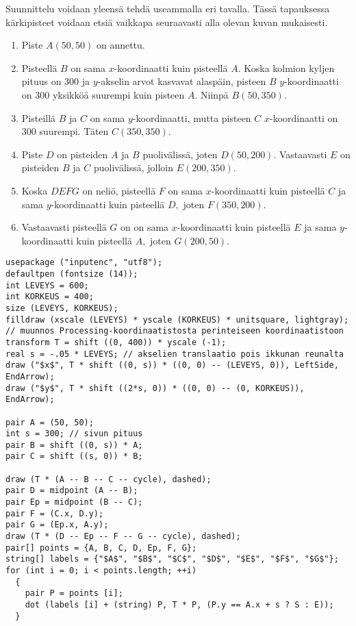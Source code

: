 \documentclass[11pt]{article}
\begin{document}
Suunnittelu voidaan yleensä tehdä useammalla eri tavalla. Tässä
tapauksessa kärkipisteet voidaan etsiä vaikkapa seuraavasti alla
olevan kuvan mukaisesti.
\begin{enumerate}
\item Piste \(A (50, 50)\) on annettu.
\item Pisteellä \(B\) on sama \(x\)-koordinaatti kuin pisteellä \(A.\)
Koska kolmion kyljen pituus on 300 ja \(y\)-akselin arvot
kasvavat alaspäin, pisteen \(B\) \(y\)-koordinaatti on 300
yksikköä suurempi kuin pisteen \(A\). Niinpä \(B(50, 350).\)
\item Pisteillä \(B\) ja \(C\) on sama \(y\)-koordinaatti, mutta pisteen
\(C\) \(x\)-koordinaatti on 300 suurempi. Täten \(C(350, 350).\)
\item Piste \(D\) on pisteiden \(A\) ja \(B\) puolivälissä, joten \(D(50,
      200).\) Vastaavasti \(E\) on pisteiden \(B\) ja \(C\) puolivälissä,
jolloin \(E(200, 350).\)
\item Koska \(DEFG\) on neliö, pisteellä \(F\) on sama \(x\)-koordinaatti
kuin pisteellä \(C\) ja sama \(y\)-koordinaatti kuin pisteellä
\(D,\) joten \(F(350, 200).\)
\item Vastaavasti pisteellä \(G\) on on sama \(x\)-koordinaatti kuin
pisteellä \(E\) ja sama \(y\)-koordinaatti kuin pisteellä \(A,\)
joten \(G(200, 50).\)
\end{enumerate}

\begin{verbatim}
usepackage ("inputenc", "utf8");
defaultpen (fontsize (14));
int LEVEYS = 600;
int KORKEUS = 400;
size (LEVEYS, KORKEUS);
filldraw (xscale (LEVEYS) * yscale (KORKEUS) * unitsquare, lightgray);
// muunnos Processing-koordinaatistosta perinteiseen koordinaatistoon
transform T = shift ((0, 400)) * yscale (-1); 
real s = -.05 * LEVEYS; // akselien translaatio pois ikkunan reunalta
draw ("$x$", T * shift ((0, s)) * ((0, 0) -- (LEVEYS, 0)), LeftSide, EndArrow);
draw ("$y$", T * shift ((2*s, 0)) * ((0, 0) -- (0, KORKEUS)), EndArrow);

pair A = (50, 50);
int s = 300; // sivun pituus
pair B = shift ((0, s)) * A;
pair C = shift ((s, 0)) * B;

draw (T * (A -- B -- C -- cycle), dashed);
pair D = midpoint (A -- B);
pair Ep = midpoint (B -- C);
pair F = (C.x, D.y);
pair G = (Ep.x, A.y);
draw (T * (D -- Ep -- F -- G -- cycle), dashed);
pair[] points = {A, B, C, D, Ep, F, G};
string[] labels = {"$A$", "$B$", "$C$", "$D$", "$E$", "$F$", "$G$"};
for (int i = 0; i < points.length; ++i)
  {
    pair P = points [i];
    dot (labels [i] + (string) P, T * P, (P.y == A.x + s ? S : E));
  }
\end{verbatim}
\end{document}
